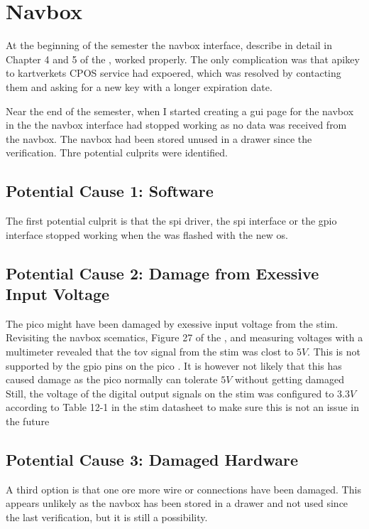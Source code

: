 \section{Navbox}
At the beginning of the semester the \gls{navbox} interface, describe in detail in Chapter 4 and 5 of the \preproject, worked properly.
The only complication was that \gls{apikey} to \gls{kartverket}s CPOS service had expoered, which was resolved by contacting them and asking for a new key with a longer expiration date.

Near the end of the semester, when I started creating a \gls{gui} page for the \gls{navbox} in the \srgui the \gls{navbox} interface had stopped working as no data was received from the \gls{navbox}.
The \gls{navbox} had been stored unused in a drawer since the verification.
Thre potential culprits were identified.

\subsection{Potential Cause 1: \jx Software}
The first potential culprit is that the \gls{spi} driver, the \gls{spi} \py interface or the \gls{gpio} interface stopped working when the \jx was flashed with the new \gls{os}.

\subsection{Potential Cause 2: Damage from Exessive Input Voltage}
The \gls{pico} might have been damaged by exessive input voltage from the \gls{stim}.
Revisiting the \gls{navbox} scematics, Figure 27 of the \preproject, and measuring voltages with a multimeter revealed that the \gls{tov} signal from the \gls{stim} was clost to $5V$.
This is not supported by the \gls{gpio} pins on the \gls{pico} \cite[17]{PicoDatasheet}.
It is however not likely that this has caused damage as the \gls{pico} normally can tolerate $5V$ without getting damaged \cite{aryavoronovaRP20405VLogic2023}
Still, the voltage of the digital output signals on the \gls{stim} was configured to $3.3V$ according to Table 12-1 in the \gls{stim} datasheet to make sure this is not an issue in the future \cite[118]{safranSTIM300Datasheet}

\subsection{Potential Cause 3: Damaged Hardware}
A third option is that one ore more wire or connections have been damaged.
This appears unlikely as the \gls{navbox} has been stored in a drawer and not used since the last verification, but it is still a possibility.

